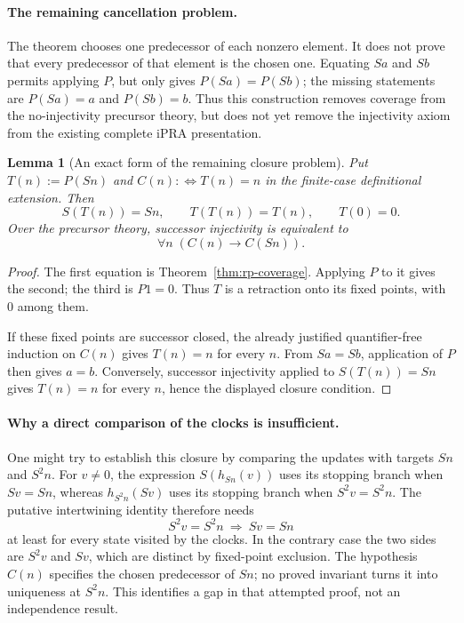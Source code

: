 \documentclass[11pt,letterpaper]{article}
\newtheorem{lemma}[theorem]{Lemma}
\theoremstyle{definition}\newtheorem{definition}[theorem]{Definition}
\theoremstyle{remark}\newtheorem{remark}[theorem]{Remark}
\begin{document}
\paragraph{The remaining cancellation problem.}
The theorem chooses one predecessor of each nonzero element. It does not
prove that every predecessor of that element is the chosen one. Equating
$Sa$ and $Sb$ permits applying $P$, but only gives $P(Sa)=P(Sb)$; the
missing statements are $P(Sa)=a$ and $P(Sb)=b$. Thus this construction
removes coverage from the no-injectivity precursor theory, but does not
yet remove the injectivity axiom from the existing complete iPRA
presentation.

\begin{lemma}[An exact form of the remaining closure problem]
\label{lem:rp-retraction}
Put $T(n):=P(Sn)$ and $C(n):\!\iff T(n)=n$ in the finite-case
definitional extension. Then
\[
 S(T(n))=Sn,\qquad T(T(n))=T(n),\qquad T(0)=0.
\]
Over the precursor theory, successor injectivity is equivalent to
\[
                         \forall n\;(C(n)\to C(Sn)).
\]
\end{lemma}
\begin{proof}
The first equation is Theorem~\ref{thm:rp-coverage}. Applying $P$ to it
gives the second; the third is $P1=0$. Thus $T$ is a retraction onto
its fixed points, with $0$ among them.

If these fixed points are successor closed, the already justified
quantifier-free induction on $C(n)$ gives $T(n)=n$ for every $n$.
From $Sa=Sb$, application of $P$ then gives $a=b$. Conversely,
successor injectivity applied to $S(T(n))=Sn$ gives $T(n)=n$ for
every $n$, hence the displayed closure condition.
\end{proof}

\paragraph{Why a direct comparison of the clocks is insufficient.}
One might try to establish this closure by comparing the updates with
targets $Sn$ and $S^2n$. For $v\ne0$, the expression $S(h_{Sn}(v))$
uses its stopping branch when $Sv=Sn$, whereas $h_{S^2n}(Sv)$ uses
its stopping branch when $S^2v=S^2n$. The putative intertwining
identity therefore needs
\[
                         S^2v=S^2n\ \Longrightarrow\ Sv=Sn
\]
at least for every state visited by the clocks. In the contrary case
the two sides are $S^2v$ and $Sv$, which are distinct by fixed-point
exclusion. The hypothesis $C(n)$ specifies the chosen predecessor of
$Sn$; no proved invariant turns it into uniqueness at $S^2n$.
This identifies a gap in that attempted proof, not an independence
result.
\end{document}
